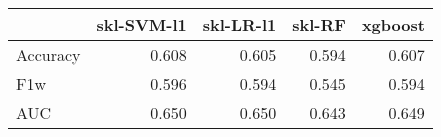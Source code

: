 \begin{tabular}{lrrrr}
\toprule
{} &  skl-SVM-l1 &  skl-LR-l1 &  skl-RF &  xgboost \\
\midrule
Accuracy &       0.608 &      0.605 &   0.594 &    0.607 \\
F1w      &       0.596 &      0.594 &   0.545 &    0.594 \\
AUC      &       0.650 &      0.650 &   0.643 &    0.649 \\
\bottomrule
\end{tabular}
